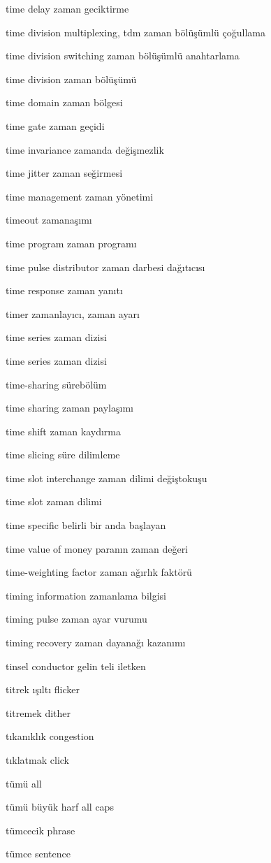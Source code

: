 \documentclass[12pt,fleqn]{article}\usepackage{../../common}
\begin{document}
time delay zaman geciktirme

time division multiplexing, tdm zaman bölüşümlü çoğullama

time division switching zaman bölüşümlü anahtarlama

time division zaman bölüşümü

time domain zaman bölgesi

time gate zaman geçidi

time invariance zamanda değişmezlik

time jitter zaman seğirmesi

time management zaman yönetimi

timeout zamanaşımı

time program zaman programı

time pulse distributor zaman darbesi dağıtıcısı

time response zaman yanıtı

timer zamanlayıcı, zaman ayarı

time series zaman dizisi

time series zaman dizisi

time-sharing sürebölüm

time sharing zaman paylaşımı

time shift zaman kaydırma

time slicing süre dilimleme

time slot interchange zaman dilimi değiştokuşu

time slot zaman dilimi

time specific belirli bir anda başlayan

time value of money paranın zaman değeri

time-weighting factor zaman ağırlık faktörü

timing information zamanlama bilgisi

timing pulse zaman ayar vurumu

timing recovery zaman dayanağı kazanımı

tinsel conductor gelin teli iletken

titrek ışıltı flicker

titremek dither

tıkanıklık congestion

tıklatmak click

tümü all

tümü büyük harf all caps

tümcecik phrase

tümce sentence
\end{document}
